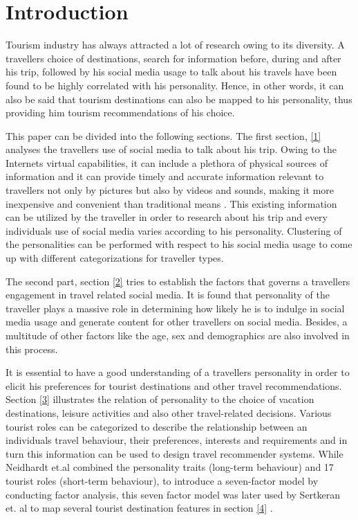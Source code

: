\section{Introduction}
		
Tourism industry has always attracted a lot of research owing to its diversity. A traveller\textquotesingle s choice of destinations, search for information before, during and after his trip, followed by his social media usage to talk about his travels have been found to be highly correlated with his personality. Hence, in other words, it can also be said that tourism destinations can also be mapped to his personality, thus providing him tourism recommendations of his choice. 		

This paper can be divided into the following sections. The first section, \ref{1} analyses the traveller\textquotesingle s use of social media to talk about his trip. Owing to the Internet\textquotesingle s virtual capabilities, it can include a plethora of physical sources of information and it can provide timely and accurate information relevant to travellers not only by pictures but also by videos and sounds, making it more inexpensive and convenient than traditional means \cite{amaro2016travelers}. This existing information can be utilized by the traveller in order to research about his trip and every individual\textquotesingle s use of social media varies according to his personality. Clustering of the personalities can be performed with respect to his social media usage to come up with different categorizations for traveller types.
				
The second part, section \ref{2} tries to establish the factors that governs a traveller\textquotesingle s engagement in travel related social media. It is found that personality of the traveller plays a massive role in determining how likely he is to indulge in social media usage and generate content for other travellers on social media. Besides, a multitude of other factors like the age, sex and demographics are also involved in this process.


It is essential to have a good understanding of a traveller\textquotesingle s personality in order to elicit his preferences for tourist destinations and other travel recommendations. Section \ref{3} illustrates the relation of personality to the choice of vacation destinations, leisure activities and also other travel-related decisions. Various tourist roles can be categorized to describe the relationship between an individual\textquotesingle s travel behaviour, their preferences, interests and requirements and in turn this information can be used to design travel recommender systems. While Neidhardt et.al \cite{neidhardt2015picture}\cite{neidhardt2014eliciting} combined the personality traits (long-term behaviour) and 17
tourist roles (short-term behaviour), to introduce a seven-factor
model by conducting factor analysis, this seven factor model was later used by Sertkeran et. al to map several tourist destination features in section \ref{4} \cite{sertkan2018mapping}.





